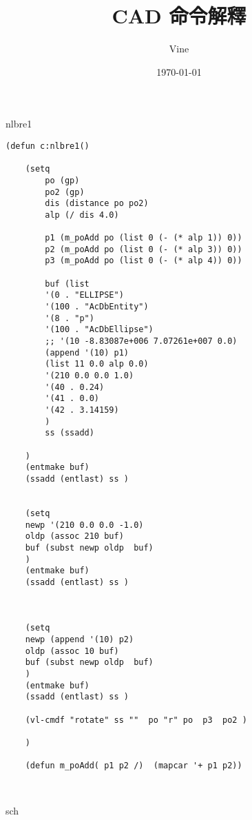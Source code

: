 \documentclass[UTF8]{ctexart}
\title{CAD 命令解釋}
\author{Vine}
\date{\today}
\begin{document}
\setlength{\headheight}{15pt}
\maketitle %
\newpage


nlbre1

\begin{lstlisting}[style=v1]
    (defun c:nlbre1()

    (setq 
        po (gp)
        po2 (gp)
        dis (distance po po2)
        alp (/ dis 4.0)

        p1 (m_poAdd po (list 0 (- (* alp 1)) 0))
        p2 (m_poAdd po (list 0 (- (* alp 3)) 0))
        p3 (m_poAdd po (list 0 (- (* alp 4)) 0))

        buf (list 
        '(0 . "ELLIPSE")
        '(100 . "AcDbEntity") 
        '(8 . "p")
        '(100 . "AcDbEllipse") 
        ;; '(10 -8.83087e+006 7.07261e+007 0.0) 
        (append '(10) p1)
        (list 11 0.0 alp 0.0) 
        '(210 0.0 0.0 1.0)
        '(40 . 0.24) 
        '(41 . 0.0) 
        '(42 . 3.14159)
        )
        ss (ssadd)

    )
    (entmake buf)
    (ssadd (entlast) ss )


    (setq 
    newp '(210 0.0 0.0 -1.0) 
    oldp (assoc 210 buf)
    buf (subst newp oldp  buf)
    )
    (entmake buf)
    (ssadd (entlast) ss )



    (setq 
    newp (append '(10) p2)
    oldp (assoc 10 buf)
    buf (subst newp oldp  buf)
    )
    (entmake buf)
    (ssadd (entlast) ss )

    (vl-cmdf "rotate" ss ""  po "r" po  p3  po2 )

    )

    (defun m_poAdd( p1 p2 /)  (mapcar '+ p1 p2))

 
\end{lstlisting}

\newpage

sch
\end{document}
